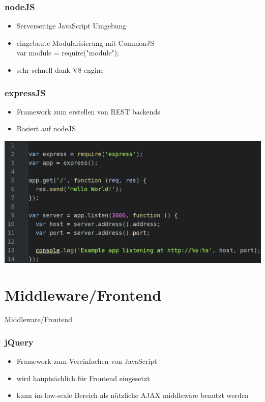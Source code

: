 \documentclass{beamer}
\begin{document}

\begin{frame}
\frametitle{nodeJS}
\begin{itemize}
\item Serverseitige JavaScript Umgebung
\item eingebaute Modularisierung mit CommonJS\\var module = require("module");
\item sehr schnell dank V8 engine
\end{itemize}
\end{frame}


\begin{frame}
\frametitle{expressJS}
\begin{itemize}
\item Framework zum erstellen von REST backends
\item Basiert auf nodeJS
\end{itemize}
\includegraphics[scale=0.23]{assets/express_example.png}
\end{frame}


\section{Middleware/Frontend}

\begin{frame}
\Huge{
\centerline{Middleware/Frontend}
}
\end{frame}


\begin{frame}
\frametitle{jQuery}
\begin{itemize}
\item Framework zum Vereinfachen von JavaScript
\item wird hauptsächlich für Frontend eingesetzt
\item kann im low-scale Bereich als nützliche AJAX middleware benutzt werden
\end{itemize}
\end{frame}
\end{document}
